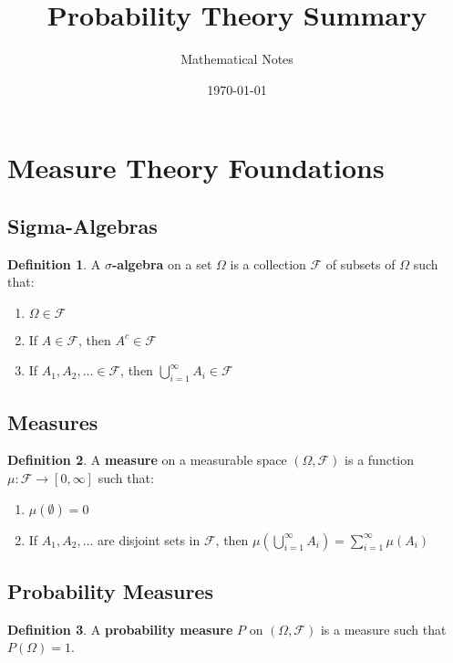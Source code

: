\documentclass[11pt]{article}
\title{Probability Theory Summary}
\author{Mathematical Notes}
\date{\today}
\theoremstyle{definition}
\newtheorem{definition}{Definition}[section]
\begin{document}
\maketitle

\tableofcontents
\newpage

\section{Measure Theory Foundations}

\subsection{Sigma-Algebras}
\begin{definition}
A \textbf{$\sigma$-algebra} on a set $\Omega$ is a collection $\mathcal{F}$ of subsets of $\Omega$ such that:
\begin{enumerate}
    \item $\Omega \in \mathcal{F}$
    \item If $A \in \mathcal{F}$, then $A^c \in \mathcal{F}$
    \item If $A_1, A_2, \ldots \in \mathcal{F}$, then $\bigcup_{i=1}^{\infty} A_i \in \mathcal{F}$
\end{enumerate}
\end{definition}

\subsection{Measures}
\begin{definition}
A \textbf{measure} on a measurable space $(\Omega, \mathcal{F})$ is a function $\mu: \mathcal{F} \to [0, \infty]$ such that:
\begin{enumerate}
    \item $\mu(\emptyset) = 0$
    \item If $A_1, A_2, \ldots$ are disjoint sets in $\mathcal{F}$, then $\mu(\bigcup_{i=1}^{\infty} A_i) = \sum_{i=1}^{\infty} \mu(A_i)$
\end{enumerate}
\end{definition}

\subsection{Probability Measures}
\begin{definition}
A \textbf{probability measure} $P$ on $(\Omega, \mathcal{F})$ is a measure such that $P(\Omega) = 1$.
\end{definition}
\end{document}
